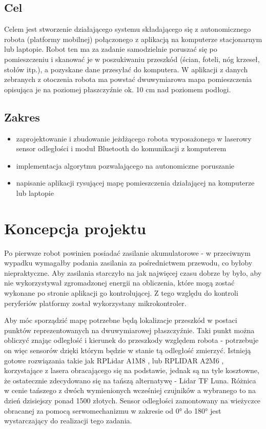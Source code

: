 \subsection{Cel}
Celem jest stworzenie działającego systemu składającego się z autonomicznego robota (platformy mobilnej) połączonego z aplikacją na komputerze stacjonarnym lub laptopie. Robot ten ma za zadanie samodzielnie poruszać się po pomieszczeniu i skanować je w poszukiwaniu przeszkód (ścian, foteli, nóg krzeseł, stołów itp.), a pozyskane dane przesyłać do komputera. W
aplikacji z danych zebranych z otoczenia robota ma powstać dwuwymiarowa mapa pomieszczenia opisująca je na poziomej płaszczyźnie ok. 10 cm nad poziomem podłogi.

\subsection{Zakres}
\begin{itemize}
    \item zaprojektowanie i zbudowanie jeżdżącego robota wyposażonego w laserowy sensor odległości i moduł Bluetooth do komunikacji z komputerem
    \item implementacja algorytmu pozwalającego na autonomiczne poruszanie
    \item napisanie aplikacji rysującej mapę pomieszczenia działającej na komputerze lub laptopie
\end{itemize}


\section{Koncepcja projektu}
Po pierwsze robot powinien posiadać zasilanie akumulatorowe - w przeciwnym wypadku wymagałby podania zasilania za pośrednictwem przewodu, co byłoby niepraktyczne. Aby zasilania starczyło na jak najwięcej czasu dobrze by było, aby nie wykorzystywał zgromadzonej energii na obliczenia, które mogą zostać wykonane po stronie aplikacji go kontrolującej. Z tego względu do kontroli peryferiów platformy został wykorzystany mikrokontroler.

Aby móc sporządzić mapę potrzebne będą lokalizacje przeszkód w postaci punktów reprezentowanych na dwuwymiarowej płaszczyźnie. Taki punkt można obliczyć znając odległość i kierunek do przeszkody względem robota - potrzebuje on więc  sensorów dzięki którym będzie w stanie tą odległość zmierzyć. Istnieją gotowe rozwiązania takie jak RPLidar A1M8 \cite{lidar-datasheet-6}, lub RPLIDAR A2M6 \cite{lidar-datasheet-10}, korzystające z lasera obracającego się na podstawie, jednak są na tyle kosztowne, że ostatecznie zdecydowano się na tańszą alternatywę - Lidar TF Luna. Różnica w cenie tańszego z dwóch wymienionych wcześniej czujników a wybranego to na dzień dzisiejszy ponad 1500 złotych. Sensor odległości zamontowany na wieżyczce obracanej za pomocą serwomechanizmu  w zakresie od 0° do 180° jest wystarczający do realizacji tego zadania.

